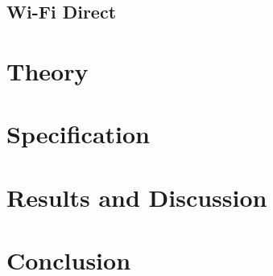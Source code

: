 \documentclass[twocolumn]{article}
\begin{document}

\subsection{Wi-Fi Direct}\label{sec:wifi-direct} %


\section{Theory}\label{sec:theory} %




\section{Specification}\label{sec:specification} %








\section{Results and Discussion}\label{sec:results-discussion} %





\section{Conclusion} %




\printbibliography{}
\end{document}

